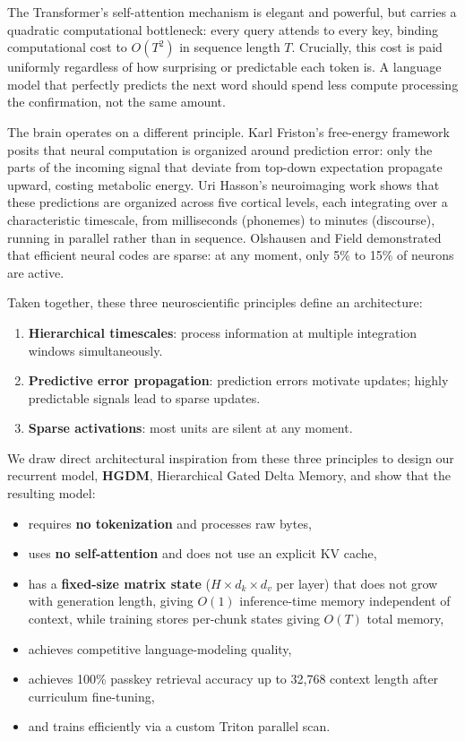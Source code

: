 \documentclass{article}
\begin{document}
The Transformer's self-attention mechanism is elegant and powerful, but carries
a quadratic computational bottleneck: every query attends to every key, binding
computational cost to $O(T^2)$ in sequence length $T$. Crucially, this cost is
paid uniformly regardless of how surprising or predictable each token is. A
language model that perfectly predicts the next word should spend less
compute processing the confirmation, not the same amount.

The brain operates on a different principle. Karl Friston's free-energy
framework \cite{friston2010fep} posits that neural computation is organized
around prediction error: only the parts of the incoming signal that
deviate from top-down expectation propagate upward, costing metabolic energy.
Uri Hasson's neuroimaging work \cite{hasson2008hierarchy,lerner2011trw}
shows that these predictions are organized across five cortical levels, each
integrating over a characteristic timescale, from milliseconds (phonemes) to
minutes (discourse), running in parallel rather than in sequence. Olshausen and Field
\cite{olshausen1996sparse} demonstrated that efficient neural codes are
sparse: at any moment, only 5\% to 15\% of neurons are active.

Taken together, these three neuroscientific principles define an architecture:
\begin{enumerate}
  \item \textbf{Hierarchical timescales}: process information at multiple
  integration windows simultaneously.
  \item \textbf{Predictive error propagation}: prediction errors
  motivate updates; highly predictable signals lead to sparse updates.
  \item \textbf{Sparse activations}: most units are silent at any moment.
\end{enumerate}

We draw direct architectural inspiration from these three principles to design our recurrent model, \textbf{HGDM},
Hierarchical Gated Delta Memory, and show that the resulting model:
\begin{itemize}
  \item requires \textbf{no tokenization} and processes raw bytes,
  \item uses \textbf{no self-attention} and does not use an explicit KV cache,
  \item has a \textbf{fixed-size matrix state} ($H \times d_k \times d_v$ per layer)
  that does not grow with generation length, giving $O(1)$ inference-time memory
  independent of context, while training stores per-chunk states giving $O(T)$ total memory,
  \item achieves competitive language-modeling quality,
  \item achieves 100\% passkey retrieval accuracy up to 32{,}768 context length after curriculum fine-tuning,
  \item and trains efficiently via a custom Triton parallel scan.
\end{itemize}
\end{document}
